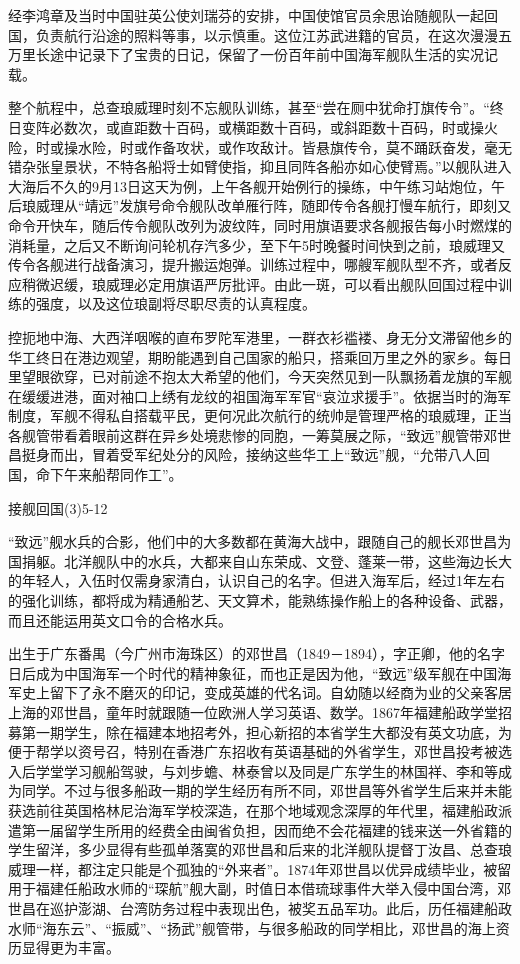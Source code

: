 \documentclass[12pt,UTF8]{ctexbook}
\begin{document}
经李鸿章及当时中国驻英公使刘瑞芬的安排，中国使馆官员余思诒随舰队一起回国，负责航行沿途的照料等事，以示慎重。这位江苏武进籍的官员，在这次漫漫五万里长途中记录下了宝贵的日记，保留了一份百年前中国海军舰队生活的实况记载。

整个航程中，总查琅威理时刻不忘舰队训练，甚至“尝在厕中犹命打旗传令”。“终日变阵必数次，或直距数十百码，或横距数十百码，或斜距数十百码，时或操火险，时或操水险，时或作备攻状，或作攻敌计。皆悬旗传令，莫不踊跃奋发，毫无错杂张皇景状，不特各船将士如臂使指，抑且同阵各船亦如心使臂焉。”以舰队进入大海后不久的9月13日这天为例，上午各舰开始例行的操练，中午练习站炮位，午后琅威理从“靖远”发旗号命令舰队改单雁行阵，随即传令各舰打慢车航行，即刻又命令开快车，随后传令舰队改列为波纹阵，同时用旗语要求各舰报告每小时燃煤的消耗量，之后又不断询问轮机存汽多少，至下午5时晚餐时间快到之前，琅威理又传令各舰进行战备演习，提升搬运炮弹。训练过程中，哪艘军舰队型不齐，或者反应稍微迟缓，琅威理必定用旗语严厉批评。由此一斑，可以看出舰队回国过程中训练的强度，以及这位琅副将尽职尽责的认真程度。

控扼地中海、大西洋咽喉的直布罗陀军港里，一群衣衫褴褛、身无分文滞留他乡的华工终日在港边观望，期盼能遇到自己国家的船只，搭乘回万里之外的家乡。每日里望眼欲穿，已对前途不抱太大希望的他们，今天突然见到一队飘扬着龙旗的军舰在缓缓进港，面对袖口上绣有龙纹的祖国海军军官“哀泣求援手”。依据当时的海军制度，军舰不得私自搭载平民，更何况此次航行的统帅是管理严格的琅威理，正当各舰管带看着眼前这群在异乡处境悲惨的同胞，一筹莫展之际，“致远”舰管带邓世昌挺身而出，冒着受军纪处分的风险，接纳这些华工上“致远”舰，“允带八人回国，命下午来船帮同作工”。

接舰回国(3)5-12

“致远”舰水兵的合影，他们中的大多数都在黄海大战中，跟随自己的舰长邓世昌为国捐躯。北洋舰队中的水兵，大都来自山东荣成、文登、蓬莱一带，这些海边长大的年轻人，入伍时仅需身家清白，认识自己的名字。但进入海军后，经过1年左右的强化训练，都将成为精通船艺、天文算术，能熟练操作船上的各种设备、武器，而且还能运用英文口令的合格水兵。

出生于广东番禺（今广州市海珠区）的邓世昌（1849－1894），字正卿，他的名字日后成为中国海军一个时代的精神象征，而也正是因为他，“致远”级军舰在中国海军史上留下了永不磨灭的印记，变成英雄的代名词。自幼随以经商为业的父亲客居上海的邓世昌，童年时就跟随一位欧洲人学习英语、数学。1867年福建船政学堂招募第一期学生，除在福建本地招考外，担心新招的本省学生大都没有英文功底，为便于帮学以资号召，特别在香港广东招收有英语基础的外省学生，邓世昌投考被选入后学堂学习舰船驾驶，与刘步蟾、林泰曾以及同是广东学生的林国祥、李和等成为同学。不过与很多船政一期的学生经历有所不同，邓世昌等外省学生后来并未能获选前往英国格林尼治海军学校深造，在那个地域观念深厚的年代里，福建船政派遣第一届留学生所用的经费全由闽省负担，因而绝不会花福建的钱来送一外省籍的学生留洋，多少显得有些孤单落寞的邓世昌和后来的北洋舰队提督丁汝昌、总查琅威理一样，都注定只能是个孤独的“外来者”。1874年邓世昌以优异成绩毕业，被留用于福建任船政水师的“琛航”舰大副，时值日本借琉球事件大举入侵中国台湾，邓世昌在巡护澎湖、台湾防务过程中表现出色，被奖五品军功。此后，历任福建船政水师“海东云”、“振威”、“扬武”舰管带，与很多船政的同学相比，邓世昌的海上资历显得更为丰富。
\end{document}
